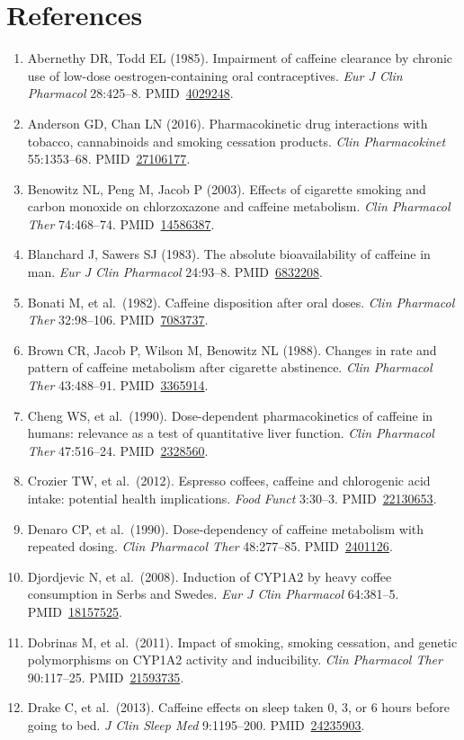 \documentclass[10pt,a4paper]{article}
\newcommand{\pmid}[1]{PMID~\href{https://pubmed.ncbi.nlm.nih.gov/#1/}{#1}}
\begin{document}
\section*{References}
\small
\begin{enumerate}[leftmargin=*,label={}]
\item Abernethy DR, Todd EL (1985). Impairment of caffeine clearance by chronic use of low-dose oestrogen-containing oral contraceptives. \emph{Eur J Clin Pharmacol} 28:425--8. \pmid{4029248}.
\item Anderson GD, Chan LN (2016). Pharmacokinetic drug interactions with tobacco, cannabinoids and smoking cessation products. \emph{Clin Pharmacokinet} 55:1353--68. \pmid{27106177}.
\item Benowitz NL, Peng M, Jacob P (2003). Effects of cigarette smoking and carbon monoxide on chlorzoxazone and caffeine metabolism. \emph{Clin Pharmacol Ther} 74:468--74. \pmid{14586387}.
\item Blanchard J, Sawers SJ (1983). The absolute bioavailability of caffeine in man. \emph{Eur J Clin Pharmacol} 24:93--8. \pmid{6832208}.
\item Bonati M, et al.\ (1982). Caffeine disposition after oral doses. \emph{Clin Pharmacol Ther} 32:98--106. \pmid{7083737}.
\item Brown CR, Jacob P, Wilson M, Benowitz NL (1988). Changes in rate and pattern of caffeine metabolism after cigarette abstinence. \emph{Clin Pharmacol Ther} 43:488--91. \pmid{3365914}.
\item Cheng WS, et al.\ (1990). Dose-dependent pharmacokinetics of caffeine in humans: relevance as a test of quantitative liver function. \emph{Clin Pharmacol Ther} 47:516--24. \pmid{2328560}.
\item Crozier TW, et al.\ (2012). Espresso coffees, caffeine and chlorogenic acid intake: potential health implications. \emph{Food Funct} 3:30--3. \pmid{22130653}.
\item Denaro CP, et al.\ (1990). Dose-dependency of caffeine metabolism with repeated dosing. \emph{Clin Pharmacol Ther} 48:277--85. \pmid{2401126}.
\item Djordjevic N, et al.\ (2008). Induction of CYP1A2 by heavy coffee consumption in Serbs and Swedes. \emph{Eur J Clin Pharmacol} 64:381--5. \pmid{18157525}.
\item Dobrinas M, et al.\ (2011). Impact of smoking, smoking cessation, and genetic polymorphisms on CYP1A2 activity and inducibility. \emph{Clin Pharmacol Ther} 90:117--25. \pmid{21593735}.
\item Drake C, et al.\ (2013). Caffeine effects on sleep taken 0, 3, or 6 hours before going to bed. \emph{J Clin Sleep Med} 9:1195--200. \pmid{24235903}.

\end{enumerate}
\end{document}
